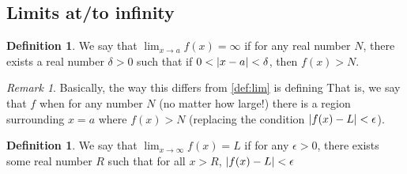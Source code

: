 \documentclass[english]{book}
\DeclarePairedDelimiter\abs{\lvert}{\rvert}%
\theoremstyle{remark}
\newtheorem{remark}{Remark}[theorem]
\theoremstyle{definition}
\newtheorem{definition}[theorem]{Definition}
\newtheorem*{next week}{Next Week}
\newcommand{\dlim}{\displaystyle\lim}
\begin{document}
\subsection{Limits at/to infinity}
\begin{definition}\label{def:limto}
	We say that $\dlim_{x\to a}f(x)=\infty$ if for any real number $N$, there exists a real number $\delta>0$ such that if $0<\abs{x-a}<\delta$, then $f(x)>N$. 
\end{definition}
\begin{remark}
	Basically, the way this differs from \ref{def:lim} is defining  That is, we say that $f$  when for any number $N$ (no matter how large!) there is a region surrounding $x=a$ where $f(x)>N$ (replacing the condition $\abs{f(x)-L}<\epsilon$).
\end{remark}
\begin{definition}\label{def:limat}
We say that $\dlim_{x\to \infty} f(x)=L$ if for any $\epsilon>0$, there exists some real number $R$ such that for all $x>R$, $\abs{f(x)-L}<\epsilon$
\end{definition}
\end{document}
